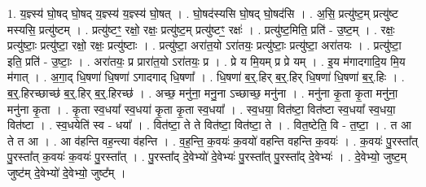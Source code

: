 \documentclass[17pt]{extarticle}
\begin{document}
1. य॒ज्ञ्स्य॑ घो॒षद् घो॒षद् य॒ज्ञ्स्य॑ य॒ज्ञ्स्य॑ घो॒षत् । . घो॒षद॑स्यसि घो॒षद् घो॒षद॑सि । . अ॒सि॒ प्रत्यु॑ष्ट॒म् प्रत्यु॑ष्ट मस्यसि॒ प्रत्यु॑ष्टम् । . प्रत्यु॑ष्टꣳ॒॒ रक्षो॒ रक्षः॒ प्रत्यु॑ष्ट॒म् प्रत्यु॑ष्टꣳ॒॒ रक्षः॑ । . प्रत्यु॑ष्ट॒मिति॒ प्रति॑ - उ॒ष्ट॒म् । . रक्षः॒ प्रत्यु॑ष्टाः॒ प्रत्यु॑ष्टा॒ रक्षो॒ रक्षः॒ प्रत्यु॑ष्टाः । . प्रत्यु॑ष्टा॒ अरा॑त॒यो ऽरा॑तयः॒ प्रत्यु॑ष्टाः॒ प्रत्यु॑ष्टा॒ अरा॑तयः । . प्रत्यु॑ष्टा॒ इति॒ प्रति॑ - उ॒ष्टाः॒ । . अरा॑तयः॒ प्र प्रारा॑त॒यो ऽरा॑तयः॒ प्र । . प्रे य मि॒यम् प्र प्रे यम् । . इ॒य म॑गादगादि॒य मि॒य म॑गात् । . अ॒गा॒द् धि॒षणा॑ धि॒षणा॑ ऽगादगाद् धि॒षणा᳚ । . धि॒षणा॑ ब॒र्॒.हिर् ब॒र्॒.हिर् धि॒षणा॑ धि॒षणा॑ ब॒र्॒.हिः । . ब॒र्॒.हिरच्छाच्छ॑ ब॒र्॒.हिर् ब॒र्॒.हिरच्छ॑ । . अच्छ॒ मनु॑ना॒ मनु॒ना ऽच्छाच्छ॒ मनु॑ना । . मनु॑ना कृ॒ता कृ॒ता मनु॑ना॒ मनु॑ना कृ॒ता । . कृ॒ता स्व॒धया᳚ स्व॒धया॑ कृ॒ता कृ॒ता स्व॒धया᳚ । . स्व॒धया॒ वित॑ष्टा॒ वित॑ष्टा स्व॒धया᳚ स्व॒धया॒ वित॑ष्टा । . स्व॒धयेति॑ स्व - धया᳚ । . वित॑ष्टा॒ ते ते वित॑ष्टा॒ वित॑ष्टा॒ ते । . वित॒ष्टेति॒ वि - त॒ष्टा॒ । . त आ ते त आ । . आ व॑हन्ति वह॒न्त्या व॑हन्ति । . व॒ह॒न्ति॒ क॒वयः॑ क॒वयो॑ वहन्ति वहन्ति क॒वयः॑ । . क॒वयः॑ पु॒रस्ता᳚त् पु॒रस्ता᳚त् क॒वयः॑ क॒वयः॑ पु॒रस्ता᳚त् । . पु॒रस्ता᳚द् दे॒वेभ्यो॑ दे॒वेभ्यः॑ पु॒रस्ता᳚त् पु॒रस्ता᳚द् दे॒वेभ्यः॑ । . दे॒वेभ्यो॒ जुष्ट॒म् जुष्ट॑म् दे॒वेभ्यो॑ दे॒वेभ्यो॒ जुष्ट᳚म् । \newline
\end{document}
